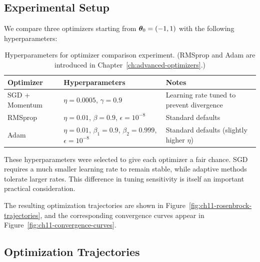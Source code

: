\documentclass[../../main.tex]{subfiles}
\begin{document}
\subsection{Experimental Setup}

We compare three optimizers starting from $\boldsymbol{\theta}_0 = (-1, 1)$ with the following hyperparameters:

\begin{table}[htbp]
\centering
\caption{Hyperparameters for optimizer comparison experiment. (RMSprop and Adam are introduced in Chapter~\ref{ch:advanced-optimizers}.)}
\label{tab:ch11-hyperparams}
\begin{tabular}{@{}llp{6cm}@{}}
\toprule
\textbf{Optimizer} & \textbf{Hyperparameters} & \textbf{Notes} \\
\midrule
SGD + Momentum & $\eta = 0.0005$, $\gamma = 0.9$ & Learning rate tuned to prevent divergence \\
RMSprop & $\eta = 0.01$, $\beta = 0.9$, $\epsilon = 10^{-8}$ & Standard defaults \\
Adam & $\eta = 0.01$, $\beta_1 = 0.9$, $\beta_2 = 0.999$, $\epsilon = 10^{-8}$ & Standard defaults (slightly higher $\eta$) \\
\bottomrule
\end{tabular}
\end{table}

\begin{important}
These hyperparameters were selected to give each optimizer a fair chance. SGD requires a much smaller learning rate to remain stable, while adaptive methods tolerate larger rates. This difference in tuning sensitivity is itself an important practical consideration.
\end{important}

The resulting optimization trajectories are shown in Figure~\ref{fig:ch11-rosenbrock-trajectories}, and the corresponding convergence curves appear in Figure~\ref{fig:ch11-convergence-curves}.

\subsection{Optimization Trajectories}
\end{document}
